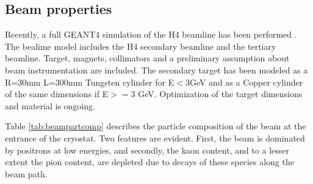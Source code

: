\subsection{Beam properties}
Recently, a full GEANT4 simulation of the H4 beamline has been performed \cite{H4beamfiles}. 
The bealime model includes the H4 secondary beamline 
and the tertiary beamline.  Target, magnets, collimators and a preliminary assumption
about beam instrumentation are included. The secondary target has been
modeled as a R=30mm L=300mm Tungsten cylinder for   E$<3$GeV and as a Copper cylinder of the same dimensions  if E$>=$3 GeV. Optimization of the target dimensions and material is ongoing.

Table \ref{tab:beampartcomp} describes the particle composition of the
beam at the entrance of the cryostat. Two features are evident. First, the beam is dominated by positrons at low energies,
and secondly, the kaon content, and to a lesser extent the pion content, are depleted due to decays of these species 
along the beam path. 

